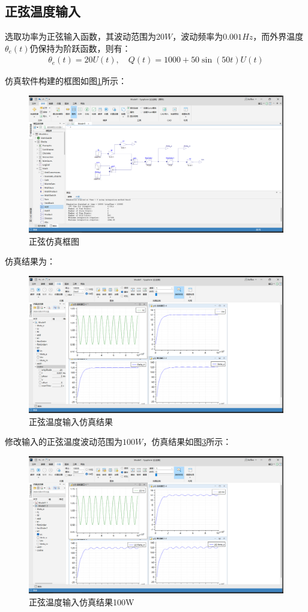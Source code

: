 \documentclass[11pt]{article}
\begin{document}
\subsection{正弦温度输入}
选取功率为正弦输入函数，其波动范围为$20\unit{W}$，波动频率为$0.001\unit{Hz}$，而外界温度$\theta_e(t)$仍保持为阶跃函数，则有：
\begin{align*}
  \theta_e(t)=20U(t),\quad Q(t)=1000+50\sin(50t)U(t)
\end{align*}\par
仿真软件构建的框图如图\ref{fig:正弦仿真框图}所示：
\begin{figure}[H]
  \centering
  \includegraphics[width=1.0\textwidth]{正弦仿真框图.png}
  \caption{正弦仿真框图}
  \label{fig:正弦仿真框图}
\end{figure}
仿真结果为：
\begin{figure}[H]
  \centering
  \includegraphics[width=1.0\textwidth]{正弦温度输入仿真.png}
  \caption{正弦温度输入仿真结果}
  \label{fig:正弦温度输入仿真}
\end{figure}
修改输入的正弦温度波动范围为$100\unit{W}$，仿真结果如图\ref{fig:正弦温度输入仿真100W}所示：
\begin{figure}[H]
  \centering
  \includegraphics[width=1.0\textwidth]{正弦温度输入仿真100W.png}
  \caption{正弦温度输入仿真结果100W}
  \label{fig:正弦温度输入仿真100W}
\end{figure}

\newpage
\printbibliography[heading=bibliography,title=参考文献]
\end{document}
